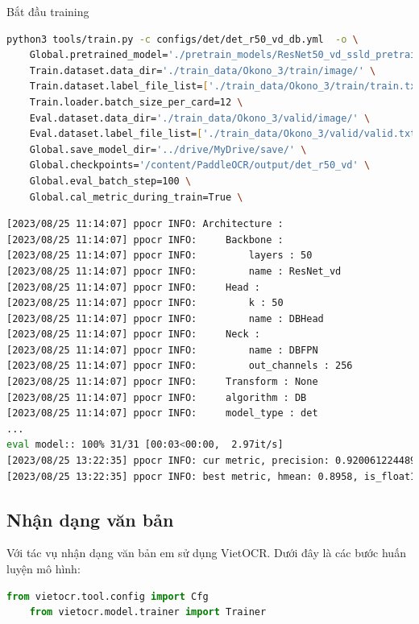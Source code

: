 Bắt đầu training 
\begin{lstlisting}[language=bash]
python3 tools/train.py -c configs/det/det_r50_vd_db.yml  -o \
    Global.pretrained_model='./pretrain_models/ResNet50_vd_ssld_pretrained.pdparams' \
    Train.dataset.data_dir='./train_data/Okono_3/train/image/' \
    Train.dataset.label_file_list=['./train_data/Okono_3/train/train.txt'] \
    Train.loader.batch_size_per_card=12 \
    Eval.dataset.data_dir='./train_data/Okono_3/valid/image/' \
    Eval.dataset.label_file_list=['./train_data/Okono_3/valid/valid.txt'] \
    Global.save_model_dir='../drive/MyDrive/save/' \
    Global.checkpoints='/content/PaddleOCR/output/det_r50_vd' \
    Global.eval_batch_step=100 \
    Global.cal_metric_during_train=True \
\end{lstlisting}
\begin{lstlisting}[language=bash]
[2023/08/25 11:14:07] ppocr INFO: Architecture : 
[2023/08/25 11:14:07] ppocr INFO:     Backbone : 
[2023/08/25 11:14:07] ppocr INFO:         layers : 50
[2023/08/25 11:14:07] ppocr INFO:         name : ResNet_vd
[2023/08/25 11:14:07] ppocr INFO:     Head : 
[2023/08/25 11:14:07] ppocr INFO:         k : 50
[2023/08/25 11:14:07] ppocr INFO:         name : DBHead
[2023/08/25 11:14:07] ppocr INFO:     Neck : 
[2023/08/25 11:14:07] ppocr INFO:         name : DBFPN
[2023/08/25 11:14:07] ppocr INFO:         out_channels : 256
[2023/08/25 11:14:07] ppocr INFO:     Transform : None
[2023/08/25 11:14:07] ppocr INFO:     algorithm : DB
[2023/08/25 11:14:07] ppocr INFO:     model_type : det
...
eval model:: 100% 31/31 [00:03<00:00,  2.97it/s]
[2023/08/25 13:22:35] ppocr INFO: cur metric, precision: 0.920061224489796, recall: 0.85067833698030635, hmean: 0.88772303595206393, fps: 14.512030517908638
[2023/08/25 13:22:35] ppocr INFO: best metric, hmean: 0.8958, is_float16: False, start_epoch: 156, precision: 0.9292, recall: 0.8648, fps: 13.95, best_epoch: 280
\end{lstlisting}

\subsection{Nhận dạng văn bản} \label{train-text-recognition}
Với tác vụ nhận dạng văn bản em sử dụng VietOCR. Dưới đây là các bước huấn luyện mô hình:
\begin{lstlisting}[language=Python]
    from vietocr.tool.config import Cfg
    from vietocr.model.trainer import Trainer
\end{lstlisting}

